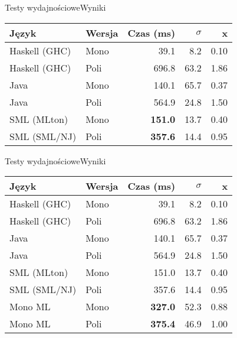 \documentclass{beamer}
\begin{document}
\begin{frame}[fragile]{Testy wydajnościowe}{Wyniki}
    
\begin{center}
\begin{table}
\begin{tabular}{|| l | l | r | r | r ||} 

 \hline
 Język & Wersja & Czas (ms) & $\sigma$ & x \\ 
 \hline\hline
 Haskell (GHC)        & Mono & 39.1  & 8.2  & 0.10 \\ 
 Haskell (GHC)        & Poli    & 696.8 & 63.2 & 1.86 \\ 
 Java                 & Mono & 140.1 & 65.7 & 0.37 \\ 
 Java                 & Poli    & 564.9 & 24.8 & 1.50 \\ 
 SML (MLton)          & Mono & \textbf{151.0} & 13.7 & 0.40 \\ 
 SML (SML/NJ)         & Poli & \textbf{357.6} & 14.4 & 0.95 \\ 
 \hline
\end{tabular}
\end{table}
\end{center}
\end{frame}

\begin{frame}[fragile]{Testy wydajnościowe}{Wyniki}
    
\begin{center}
\begin{table}
\begin{tabular}{|| l | l | r | r | r ||} 

 \hline
 Język & Wersja & Czas (ms) & $\sigma$ & x \\ 
 \hline\hline
 Haskell (GHC)        & Mono & 39.1  & 8.2  & 0.10 \\ 
 Haskell (GHC)        & Poli    & 696.8 & 63.2 & 1.86 \\ 
 Java                 & Mono & 140.1 & 65.7 & 0.37 \\ 
 Java                 & Poli    & 564.9 & 24.8 & 1.50 \\ 
 SML (MLton)          & Mono & 151.0 & 13.7 & 0.40 \\ 
 SML (SML/NJ)         & Poli    & 357.6 & 14.4 & 0.95 \\ 
 Mono ML              & Mono & \textbf{327.0} & 52.3 & 0.88 \\ 
 Mono ML              & Poli & \textbf{375.4} & 46.9 & 1.00 \\ 
 \hline
\end{tabular}
\end{table}
\end{center}
\end{frame}
\end{document}
